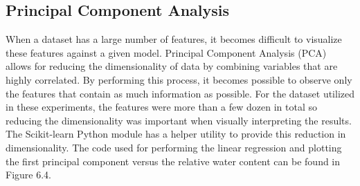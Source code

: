 \subsection{Principal Component Analysis}
When a dataset has a large number of features, it becomes difficult to visualize these features against a given model.  Principal Component Analysis (PCA) allows for reducing the dimensionality of data by combining variables that are highly correlated. By performing this process, it becomes possible to observe only the features that contain as much information as possible.  For the dataset utilized in these experiments, the features were more than a few dozen in total so reducing the dimensionality was important when visually interpreting the results. The Scikit-learn Python module has a helper utility to provide this reduction in dimensionality.  The code used for performing the linear regression and plotting the first principal component versus the relative water content can be found in Figure 6.4.
\newpage
